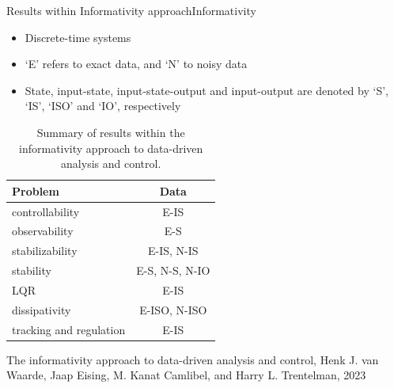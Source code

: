 \documentclass[aspectratio=169, handout, 10pt, hyperref=colorlinks]{beamer}
\begin{document}
\begin{frame}{Results within Informativity approach}{Informativity}
\begin{itemize}
    \item Discrete-time systems
    \item `E' refers to exact data, and `N' to noisy data
    \item State, input-state, input-state-output and input-output are denoted by `S', `IS', `ISO' and `IO', respectively
\end{itemize}
\begin{table}[H]  
\begin{center}
{\small\begin{tabular}{l|c}
Problem & Data\\
\hline
{controllability} & E-IS\\
observability & E-S\\
{stabilizability} & E-IS, N-IS\\
stability & E-S, N-S, N-IO\\
{LQR} & E-IS\\
{dissipativity} & E-ISO, N-ISO\\
{tracking and regulation} & E-IS\\
\end{tabular}}
\end{center}
\caption{Summary of results within the informativity approach to data-driven analysis and control.}
\label{tab:summary}
\end{table}
    \begin{center}
    \tiny{The informativity approach to data-driven analysis and control, Henk J. van Waarde, Jaap Eising, M. Kanat Camlibel, and Harry L. Trentelman, 2023}
    \end{center}
\end{frame}
\end{document}
